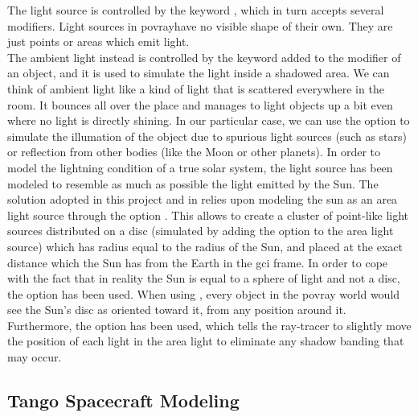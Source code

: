 The light source is controlled by the keyword , which in turn accepts several modifiers. Light sources in \acrshort{povray}have no visible shape of their own. They are just points or areas which emit light.\\
The ambient light instead is controlled by the keyword  added to the  modifier of an object, and it is used to simulate the light inside a shadowed area.
We can think of ambient light like a kind of light that is scattered everywhere in the room. It bounces all over the place and manages to light objects up a bit even where no light is directly shining.
In our particular case, we can use the  option to simulate the illumation of the object due to spurious light sources (such as stars) or reflection from other bodies (like the Moon or other planets).
In order to model the lightning condition of a true solar system, the light source has been modeled to resemble as much as possible the light emitted by the Sun.
The solution adopted in this project and in \cite{jacopo} relies upon modeling the sun as an area light source through the option . This allows to create a cluster of point-like light sources distributed on a disc (simulated by adding the  option to the area light source) which has radius equal to the radius of the Sun, and placed at the exact distance which the Sun has from the Earth in the \acrshort{gci} frame. In order to cope with the fact that in reality the Sun is equal to a sphere of light and not a disc, the option  has been used. When using , every object in the \acrshort{povray} world would see the Sun's disc as oriented toward it, from any position around it.
Furthermore, the option  has been used, which tells the ray-tracer to slightly move the position of each light in the area light to eliminate any shadow banding that may occur.

\subsection{Tango Spacecraft Modeling}

